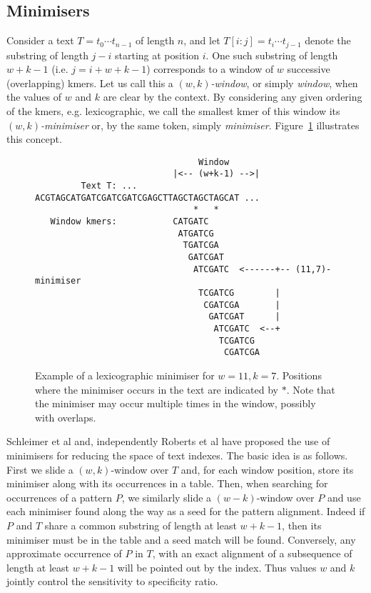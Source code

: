 \documentclass[a4paper, 12pt, oneside]{article}
\begin{document}
\subsection*{Minimisers}

Consider a text $T=t_0\cdots t_{n-1}$ of length $n$, and let $T[i:j]=t_i\cdots t_{j-1}$ denote the substring of length $j-i$\/ starting at position $i$. One such substring of length $w+k-1$ (i.e. $j=i+w+k-1$) corresponds to a window of $w$ successive (overlapping) kmers. Let us call this a \emph{$(w,k)$-window}, or simply \emph{window}, when the values of $w$ and $k$ are clear by the context. By considering any given ordering of the kmers, e.g. lexicographic, we call the smallest kmer of this window its \emph{$(w,k)$-minimiser} or, by the same token, simply \emph{minimiser}.
Figure~\ref{fig:minimiser} illustrates this concept.

\begin{figure}[htpb]
	\centering

	\begin{verbatim}
                                Window
                           |<-- (w+k-1) -->|  
         Text T: ... ACGTAGCATGATCGATCGATCGAGCTTAGCTAGCTAGCAT ...
                               *   *	
   Window kmers:           CATGATC
                            ATGATCG
                             TGATCGA
                              GATCGAT
                               ATCGATC  <------+-- (11,7)-minimiser 
                                TCGATCG        |
                                 CGATCGA       |
                                  GATCGAT      |
                                   ATCGATC  <--+
                                    TCGATCG
                                     CGATCGA
	\end{verbatim}
	\caption{Example of a lexicographic minimiser for $w=11, k=7$. Positions where the minimiser occurs in the text are indicated by $*$. Note that the minimiser may occur multiple times in the window, possibly with overlaps.} 
	\label{fig:minimiser}
\end{figure}

Schleimer et al \cite{Schleimer2003} and, independently Roberts et al \cite{Roberts2004} have proposed the use of minimisers for reducing the space of text indexes. The basic idea is as follows. First we slide a $(w,k)$-window over $T$ and, for each window position, store its minimiser along with its occurrences in a table. Then, when searching for occurrences of a pattern $P$, we similarly slide a $(w-k)$-window over $P$ and use each minimiser found along the way as a seed for the pattern alignment. Indeed if $P$ and $T$ share a common substring of length at least $w+k-1$, then its minimiser must be in the table and a seed match will be found. Conversely, any approximate occurrence of $P$ in $T$, with an exact alignment of a subsequence of length at least $w+k-1$ will be pointed out by the index. Thus values $w$ and $k$ jointly control the sensitivity to specificity ratio.
\end{document}
